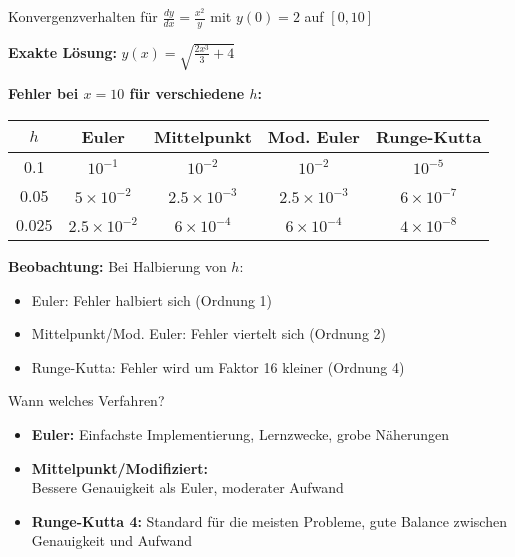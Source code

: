 \begin{example}
Konvergenzverhalten für $\frac{dy}{dx} = \frac{x^2}{y}$ mit $y(0) = 2$ auf $[0, 10]$

\textbf{Exakte Lösung:} $y(x) = \sqrt{\frac{2x^3}{3} + 4}$

\textbf{Fehler bei $x = 10$ für verschiedene $h$:}

\begin{center}
\begin{tabular}{|c|c|c|c|c|}
\hline
$h$ & Euler & Mittelpunkt & Mod. Euler & Runge-Kutta \\
\hline
0.1 & $10^{-1}$ & $10^{-2}$ & $10^{-2}$ & $10^{-5}$ \\
\hline
0.05 & $5 \times 10^{-2}$ & $2.5 \times 10^{-3}$ & $2.5 \times 10^{-3}$ & $6 \times 10^{-7}$ \\
\hline
0.025 & $2.5 \times 10^{-2}$ & $6 \times 10^{-4}$ & $6 \times 10^{-4}$ & $4 \times 10^{-8}$ \\
\hline
\end{tabular}
\end{center}

\textbf{Beobachtung:} Bei Halbierung von $h$:
\begin{itemize}
    \item Euler: Fehler halbiert sich (Ordnung 1)
    \item Mittelpunkt/Mod. Euler: Fehler viertelt sich (Ordnung 2)
    \item Runge-Kutta: Fehler wird um Faktor 16 kleiner (Ordnung 4)
\end{itemize}
\end{example}

\begin{KR}{Wann welches Verfahren?}
\begin{itemize}
    \item \textbf{Euler:} Einfachste Implementierung, Lernzwecke, grobe Näherungen
    \item \textbf{Mittelpunkt/Modifiziert:} \\Bessere Genauigkeit als Euler, moderater Aufwand
    \item \textbf{Runge-Kutta 4:} Standard für die meisten Probleme, gute Balance zwischen Genauigkeit und Aufwand
\end{itemize}
\end{KR}






